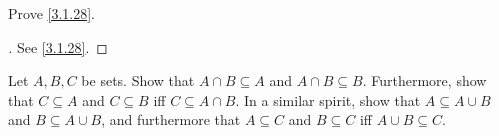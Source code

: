 \begin{ex}\label{ex:3.1.6}
  Prove \cref{3.1.28}.
\end{ex}

\begin{proof}[]
  See \cref{3.1.28}.
\end{proof}

\begin{ex}\label{ex:3.1.7}
  Let \(A, B, C\) be sets.
  Show that \(A \cap B \subseteq A\) and \(A \cap B \subseteq B\).
  Furthermore, show that \(C \subseteq A\) and \(C \subseteq B\) iff \(C \subseteq A \cap B\).
  In a similar spirit, show that \(A \subseteq A \cup B\) and \(B \subseteq A \cup B\), and furthermore that \(A \subseteq C\) and \(B \subseteq C\) iff \(A \cup B \subseteq C\).
\end{ex}


